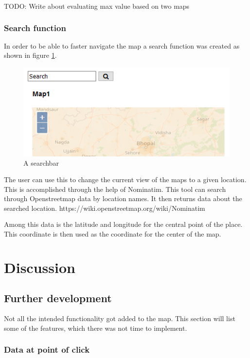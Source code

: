 TODO: Write about evaluating max value based on two maps

\subsection{Search function}
In order to be able to faster navigate the map a search function was created as shown in figure \ref{SearchBar}. 

\begin{figure} [H]
	\centering
	\includegraphics[width=.8\textwidth]{Pictures/SearchBar}
	\caption{A searchbar}
	\label{SearchBar}
\end{figure}

The user can use this to change the current view of the maps to a given location. This is accomplished through the help of Nominatim. This tool can search through Openstreetmap data by location names. It then returns data about the searched location. 
https://wiki.openstreetmap.org/wiki/Nominatim

Among this data is the latitude and longitude for the central point of the place.    
This coordinate is then used as the coordinate for the center of the map.


\chapter{Discussion}
\section{Further development}
Not all the intended functionality got added to the map. This section will list some of the features, which there was not time to implement. 

\subsection{Data at point of click}

